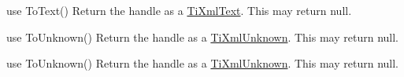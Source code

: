 \begin{DoxyRefList}
use To\+Text() Return the handle as a \hyperlink{class_ti_xml_text}{Ti\+Xml\+Text}. This may return null.  
\item[\label{deprecated__deprecated000014}%
\hypertarget{deprecated__deprecated000014}{}%
Member \hyperlink{class_ti_xml_handle_a49675b74357ba2aae124657a9a1ef465}{Ti\+Xml\+Handle\+:\+:Unknown} () const ]use To\+Unknown() Return the handle as a \hyperlink{class_ti_xml_unknown}{Ti\+Xml\+Unknown}. This may return null. 

use To\+Unknown() Return the handle as a \hyperlink{class_ti_xml_unknown}{Ti\+Xml\+Unknown}. This may return null. 
\end{DoxyRefList}